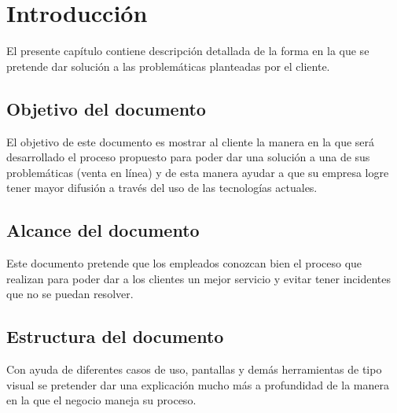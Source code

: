 
\chapter{Introducción}

	El presente capítulo contiene descripción detallada de la forma en la que se pretende dar solución a las problemáticas planteadas por el cliente. 

	\section{Objetivo del documento}
		
		El objetivo de este documento es mostrar al cliente la manera en la que será desarrollado el proceso propuesto para poder dar una solución a una de sus problemáticas (venta en línea) y de esta manera ayudar a que su empresa logre tener mayor difusión a través del uso de las tecnologías actuales.

	\section{Alcance del documento}

		Este documento pretende que los empleados conozcan bien el proceso que realizan para poder dar a los clientes un mejor servicio y evitar tener incidentes que no se puedan resolver.
		
	\section{Estructura del documento}
		
		Con ayuda de diferentes casos de uso, pantallas y demás herramientas de tipo visual se pretender dar una explicación mucho más a profundidad de la manera en la que el negocio maneja su proceso.
